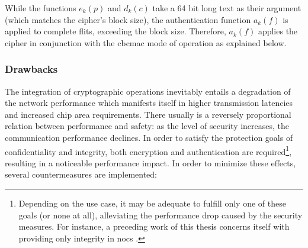 While the functions $e_k(p)$ and $d_k(c)$ take a 64 bit long text as their argument (which matches the cipher's block size), the authentication
function $a_k(f)$ is applied to complete flits, exceeding the block size. Therefore, $a_k(f)$ applies the cipher in conjunction with the \gls{cbcmac}
mode of operation as explained below.

\subsubsection{Drawbacks}\label{subsubsec:cryptodrawbacks}
The integration of cryptographic operations inevitably entails a degradation of the network performance which manifests itself in higher transmission
latencies and increased chip area requirements. There usually is a reversely proportional relation between performance and safety: as the level of security
increases, the communication performance declines. In order to satisfy the protection goals of confidentiality and integrity, both encryption and
authentication are required\footnote{Depending on the use case, it may be adequate to fulfill only one of these goals (or none at all), alleviating
the performance drop caused by the security measures. For instance, a preceding work of this thesis concerns itself with providing only integrity in
\glspl{noc} \cite{moriam18activeattackers}.}, resulting in a noticeable performance impact. In order to minimize these effects, several countermeasures
are implemented:
